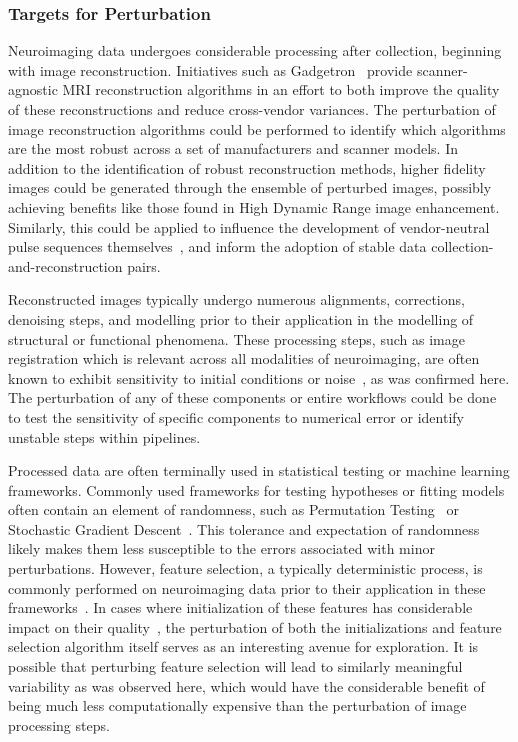 \subsubsection{Targets for Perturbation}

Neuroimaging data undergoes considerable processing after collection, beginning with image reconstruction. Initiatives
such as Gadgetron~\cite{hansen2013gadgetron} provide scanner-agnostic MRI reconstruction algorithms in an effort to
both improve the quality of these reconstructions and reduce cross-vendor variances. The perturbation of image
reconstruction algorithms could be performed to identify which algorithms are the most robust across a set of
manufacturers and scanner models. In addition to the identification of robust reconstruction methods, higher fidelity
images could be generated through the ensemble of perturbed images, possibly achieving benefits like those found in
High Dynamic Range image enhancement. Similarly, this could be applied to influence the development of vendor-neutral
pulse sequences themselves~\cite{karakuzu2020qmrlab}, and inform the adoption of stable data
collection-and-reconstruction pairs.

Reconstructed images typically undergo numerous alignments, corrections, denoising steps, and modelling prior to their
application in the modelling of structural or functional phenomena. These processing steps, such as image registration
which is relevant across all modalities of neuroimaging, are often known to exhibit sensitivity to initial conditions
or noise~\cite{salari2020file}, as was confirmed here. The perturbation of any of these components or entire workflows
could be done to test the sensitivity of specific components to numerical error or identify unstable steps within
pipelines.

Processed data are often terminally used in statistical testing or machine learning frameworks. Commonly used
frameworks for testing hypotheses or fitting models often contain an element of randomness, such as Permutation
Testing~\cite{oden1975arguments} or Stochastic Gradient Descent~\cite{bottou1991stochastic}. This tolerance and
expectation of randomness likely makes them less susceptible to the errors associated with minor perturbations.
However, feature selection, a typically deterministic process, is commonly performed on neuroimaging data prior to
their application in these frameworks~\cite{mwangi2014review}. In cases where initialization of these features has
considerable impact on their quality~\cite{kobak2021init}, the perturbation of both the initializations and feature
selection algorithm itself serves as an interesting avenue for exploration. It is possible that perturbing feature
selection will lead to similarly meaningful variability as was observed here, which would have the considerable benefit
of being much less computationally expensive than the perturbation of image processing steps.

